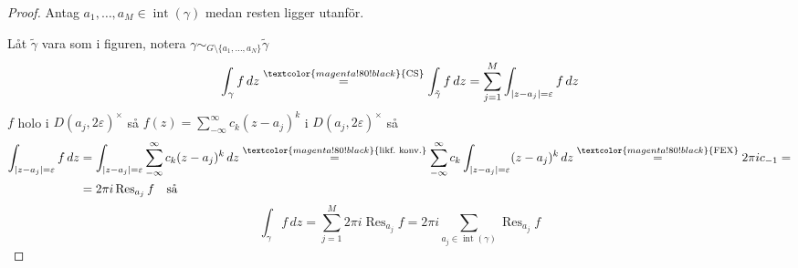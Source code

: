 \begin{proof}
Antag $a_1, \dots, a_M \in \operatorname{int}(\gamma)$ medan resten ligger utanför.


Låt $\tilde{\gamma}$ vara som i figuren, notera $\gamma \sim_{G \setminus \{a_1, \dots, a_N\}} \tilde{\gamma}$
\[ \int_\gamma f\,dz \overset{\textcolor{magenta!80!black}{\text{CS}}}{=} \int_{\tilde{\gamma}} f\,dz = \sum_{j = 1}^M \int_{|z - a_j| = \varepsilon} f\,dz \]
$f$ holo i $D(a_j, 2\varepsilon)^\times$ så $f(z) = \sum_{-\infty}^\infty c_k(z - a_j)^k$ i $D(a_j, 2\varepsilon)^\times$ så
\begin{align*}
\int_{|z - a_j| = \varepsilon} f\,dz &= \int_{|z - a_j| = \varepsilon} \sum_{-\infty}^\infty c_k(z - a_j)^k\,dz \overset{\textcolor{magenta!80!black}{\text{likf.\ konv.}}}{=} \sum_{-\infty}^\infty c_k\int_{|z - a_j| = \varepsilon} (z - a_j)^k\,dz \overset{\textcolor{magenta!80!black}{\text{FEX}}}{=} 2\pi i c_{-1} = \\
&= 2\pi i\operatorname{Res}_{a_j} f \quad \text{så}
\end{align*}
\[ \int_\gamma f\,dz = \sum_{j = 1}^M 2\pi i\operatorname{Res}_{a_j} f = 2\pi i\sum_{a_j \in \operatorname{int}(\gamma)} \operatorname{Res}_{a_j} f \]
\end{proof}

